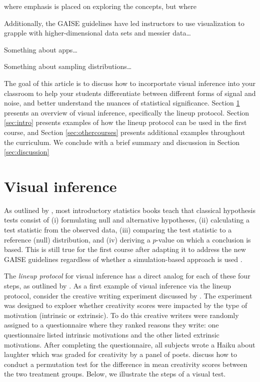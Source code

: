 \documentclass[12pt]{article}
\begin{document}
where emphasis is placed on exploring the concepts, but where

Additionally, the GAISE guidelines have led instructors to use
visualization to grapple with higher-dimensional data sets and messier
data\ldots{}

Something about apps\ldots{}

Something about sampling distributions\ldots{}

The goal of this article is to discuss how to incorportate visual
inference into your classroom to help your students differentiate
between different forms of signal and noise, and better understand the
nuances of statistical significance. Section \ref{sec:vizinf} presents
an overview of visual inference, specifically the lineup protocol.
Section \ref{sec:intro} presents examples of how the lineup protocol can
be used in the first course, and Section \ref{sec:othercourses} presents
additional examples throughout the curriculum. We conclude with a brief
summary and discussion in Section \ref{sec:discussion}

\section{Visual inference}
\label{sec:vizinf}

As outlined by \citet{Cobb-2007uo}, most introductory statistics books
teach that classical hypothesis tests consist of (i) formulating null
and alternative hypotheses, (ii) calculating a test statistic from the
observed data, (iii) comparing the test statistic to a reference (null)
distribution, and (iv) deriving a \(p\)-value on which a conclusion is
based. This is still true for the first course after adapting it to
address the new GAISE guidelines regardless of whether a
simulation-based approach is used
\citep[cf.][]{Lock2012, tintle2015, introstats}.

The \emph{lineup protocol} for visual inference has a direct analog for
each of these four steps, as outlined by \citet{Buja-2009bd}. As a first
example of visual inference via the lineup protocol, consider the
creative writing experiment discussed by \citep[pp.~2--14]{ramsey2013}.
The experiment was designed to exploer whether creativity scores were
impacted by the type of motivation (intrinsic or extrinsic). To do this
creative writers were randomly assigned to a questionnaire where they
ranked reasons they write: one questionnaire listed intrinsic
motivations and the other listed extrinsic motivations. After completing
the questionnaire, all subjects wrote a Haiku about laughter which was
graded for creativity by a panel of poets. \citet{ramsey2013} discuss
how to conduct a permutation test for the difference in mean creativity
scores between the two treatment groups. Below, we illustrate the steps
of a visual test.
\end{document}
